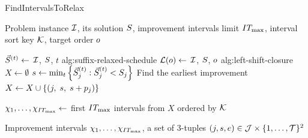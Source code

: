 \begin{algorithm}[t]
\caption{FindIntervalsToRelax}
\label{alg:find-intervals-to-relax}
\begin{algorithmic}[1]

\Input  Problem instance $\mathcal{I}$, its solution $S$, improvement intervals limit $IT_{\max}$,
\Inputc interval sort key $\mathcal{K}$, target order $o$

    $\vec{S}^{(t)} \gets$ %
                                        {$\mathcal{I}$, $S$, $t$}%
                                        {alg:suffix-relaxed-schedule}  \label{alg:ssira/ints/schedule-suffixes}
\EndFor
\State $\mathcal{L}(o) \gets$ %
                                              {$\mathcal{I}$, $S$, $o$}%
                                              {alg:left-shift-closure}  \label{alg:ssira/ints/closure}
\State $X \gets \emptyset$  \label{alg:ssira/ints/ints-init}
    \State $s \gets \min_t \left\{ \vec{S}^{(t)}_{j} : \vec{S}^{(t)}_{j} < S_{j} \right\}$  \label{alg:ssira/ints/ints-improvement}
        \Comment Find the earliest improvement
    \State $X \gets X \cup \left\{ (j,\; s,\; s + p_{j}) \right\}$  \label{alg:ssira/ints/ints-inclusion}
\EndFor

\State $\chi_1, \dots, \chi_{IT_{\max}} \gets$ first $IT_{\max}$ intervals from $X$ ordered by $\mathcal{K}$  \label{alg:ssira/ints/select-imp-ints}

\Output  Improvement intervals $\chi_1, \dots, \chi_{IT_{\max}}$,
\Outputc a set of 3-tuples $(j, s, e) \in \mathcal{J} \times \{{1}, \dots, {\mathcal{T}}\}^2$
\end{algorithmic}
\end{algorithm}

